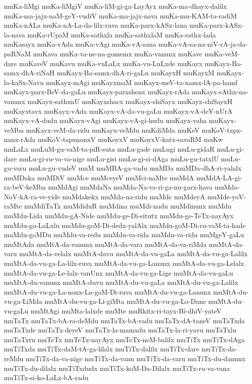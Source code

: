 {muKa-liMgi
muKa-liMgiV
muKa-liM-gi-ga-LayAyx
muKa-ma-dhayx-dalilx
muKa-ma-jajx-naM-geY-vudiV
muKa-ma-jajx-nava
muKa-mu-KAM-ta-radiM
muKa-nALa
muKa-nA-La-da-lilx-ruva
muKa-parx-kASx-lana
muKa-parx-kASx-la-nava
muKa-rUpaM
muKa-sathxla
muKa-sathxlaM
muKa-sathx-lada
muKasayx
muKa-vAda
muKa-vAgi
muKa-vA-sana
muKa-vA-sa-na-niV-rA-ja-da-paRNaM
muKava
muKa-va-ne-na-gomemx
muKa-vanunx
muKave
muKa-veM-dare
muKaveV
muKavu
muKa-vuLaLx
muKa-vu-LuLxde
muKayx
muKayx-Ba-samx-dhA-riNaH
muKayx-Ba-samx-dhA-ri-gaLu
muKayxH
muKayxM
muKayx-la-kaSx-Navu
muKayx-mAgi
muKayxmaM
muKayx-meV-ta-namx-lA-pa-hamf
muKayx-parx-BeV-da-gaLu
muKayx-parxshenx
muKayx-rAda
muKayx-sAthx-na-vanunx
muKayx-sathxnU
muKayxshacx
muKayx-shiSayx
muKayx-shiSayxH
muKayxtavx
muKayx-vAda
muKayx-vA-da-vu-gaLu
muKayx-vA-deY-nUrA
muKayx-vA-dudu
muKayx-vAgi
muKayx-vA-gi-hudu
muKayx-vaha
muKayx-veMba
muKayx-veM-da-ridu
muKayx-veMdu
muKdiMda
muKeV
muKoV-tapx-nanx-rAda
muKoV-tapxnonxV
muKoyxV
muKoyxV-katx-savaRM
muKw
muLaLx
muLuM-gu-vaM-ta-piR-suta
muLu-gade
muLugi
muLu-gidaR
muLu-gi-dare
muLu-gi-ru-va-va-nige
muLu-gisi
muLu-gi-si-dAga
muLu-gu-tatxlU
muLu-gu-varu
muLu-gu-vudeV
muM
muMBA-ga-vadu
muMDa
muMDa-dhA-ri-yalalx
muMDaka
muMDiV
muMce
muMceyeV
muMci-naMte
muMdA
muMdA-LA-gi-ra-beV-keMba
muMdAgi
muMdaNa
muMda-Na-va-ri-ga-nu-garx-hava
muMda-NoV-kA-ra-ve-yide
muMdakekx
muMda-na-ridu
muMde
muMdeyA
muMde-yoV-raMte
muMdiTaTx
muMdiduR
muMdina
muMdi-nadu
muMdinunx
muMdu
muMdu-Lida
muMdu-gA-Nide
muMdu-ge-Di-situtx
muMdu-ge-TeTx-nayAyx
muMdu-go-LaLxlu
muMdu-goM-Di-dedx-yalAlx
muMdu-goM-Di-ru-vaM-ta-hade
muMdu-goMDu
muMdu-va-redu
muMdu-va-rida
muMdu-va-ridu
muMgeY-gaLu
muMtAda
muMtA-da-vanunx
muMtA-da-vara
muMtA-da-va-riMda
muMtA-da-varu
muMtA-da-velalx
muMtA-davu
muMtA-da-vu-gaLa
muMtA-da-vu-ga-Lalilx
muMtA-da-vu-ga-La-lilx-ruva
muMtA-da-vu-ga-Lanunx
muMtA-da-vu-ga-Lelalx
muMtA-da-vu-ga-Le-lalx-vanUnx
muMtA-da-vu-ga-Lige
muMtA-da-vu-gaLu
muMtA-du-vanunx
muMtA-duvu
muMtA-du-vu-gaLa
muMtA-du-vu-ga-Lalilx
muMtA-du-vu-ga-La-nonx-La-goM-Di-ruva
muMtA-du-vu-ga-Lanunx
muMtA-du-vu-ga-LiMda
muMtA-du-vu-ga-Li-giMta
muMtA-du-vu-ga-Lo-Dane
muMtA-du-vu-gaLu
muMtAgi
muMta-lalxde
muMte
muRkitx-ri-tayx-Bi-dhiV-yateV
muTaTx
muTaTx-bA-ra-deMdu
muTaTx-bA-radu
muTaTx-dA-taneV
muTaTxda
muTaTxde
muTaTx-deyeV
muTaTx-la-mamxdu
muTaTx-la-ri-yavu
muTaTxlu
muTaTxru
muTeTx
muTeTx-nayAyx
muTeTx-neM-balilx
muTiTx
muTiTx-dAga
muTiTxda
muTiTx-daM-tA-ga-lilalx
muTiTx-dalilx
muTiTx-dare
muTiTx-da-reMdu
muTiTx-da-va-nige
muTiTx-da-vanu
muTiTx-da-varu
muTiTx-du-danunx
muTiTx-du-dilalx
muTiTxdudx
muTiTx-koM-Da-Dilalx
muTiTx-ru-va-vana
muTiTx-si-ko-LaLx-bA-radu
}
